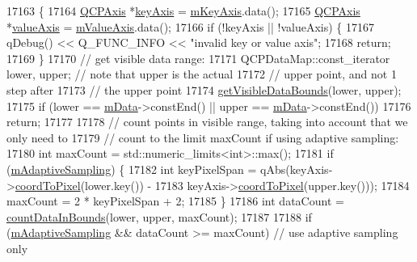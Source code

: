 \begin{DoxyCode}
17163                                                                     \{
17164   \hyperlink{class_q_c_p_axis}{QCPAxis} *\hyperlink{class_q_c_p_abstract_plottable_a72c7a09c22963f2c943f07112b311103}{keyAxis} = \hyperlink{class_q_c_p_abstract_plottable_a426f42e254d0f8ce5436a868c61a6827}{mKeyAxis}.data();
17165   \hyperlink{class_q_c_p_axis}{QCPAxis} *\hyperlink{class_q_c_p_abstract_plottable_a3106f9d34d330a6097a8ec5905e5b519}{valueAxis} = \hyperlink{class_q_c_p_abstract_plottable_a2901452ca4aea911a1827717934a4bda}{mValueAxis}.data();
17166   \textcolor{keywordflow}{if} (!keyAxis || !valueAxis) \{
17167     qDebug() << Q\_FUNC\_INFO << \textcolor{stringliteral}{"invalid key or value axis"};
17168     \textcolor{keywordflow}{return};
17169   \}
17170   \textcolor{comment}{// get visible data range:}
17171   QCPDataMap::const\_iterator lower, upper; \textcolor{comment}{// note that upper is the actual}
17172                                            \textcolor{comment}{// upper point, and not 1 step after}
17173                                            \textcolor{comment}{// the upper point}
17174   \hyperlink{class_q_c_p_graph_a6a317cb14a83dae0841c7041a63d6d9d}{getVisibleDataBounds}(lower, upper);
17175   \textcolor{keywordflow}{if} (lower == \hyperlink{class_q_c_p_graph_a8457c840f69a0ac49f61d30a509c5d08}{mData}->constEnd() || upper == \hyperlink{class_q_c_p_graph_a8457c840f69a0ac49f61d30a509c5d08}{mData}->constEnd())
17176     \textcolor{keywordflow}{return};
17177 
17178   \textcolor{comment}{// count points in visible range, taking into account that we only need to}
17179   \textcolor{comment}{// count to the limit maxCount if using adaptive sampling:}
17180   \textcolor{keywordtype}{int} maxCount = std::numeric\_limits<int>::max();
17181   \textcolor{keywordflow}{if} (\hyperlink{class_q_c_p_graph_aa951e78aeba714cf443be6da2e52502e}{mAdaptiveSampling}) \{
17182     \textcolor{keywordtype}{int} keyPixelSpan = qAbs(keyAxis->\hyperlink{class_q_c_p_axis_a985ae693b842fb0422b4390fe36d299a}{coordToPixel}(lower.key()) -
17183                             keyAxis->\hyperlink{class_q_c_p_axis_a985ae693b842fb0422b4390fe36d299a}{coordToPixel}(upper.key()));
17184     maxCount = 2 * keyPixelSpan + 2;
17185   \}
17186   \textcolor{keywordtype}{int} dataCount = \hyperlink{class_q_c_p_graph_a13f6a3aa60227e03ab1f7aa8eec6589f}{countDataInBounds}(lower, upper, maxCount);
17187 
17188   \textcolor{keywordflow}{if} (\hyperlink{class_q_c_p_graph_aa951e78aeba714cf443be6da2e52502e}{mAdaptiveSampling} && dataCount >= maxCount) \textcolor{comment}{// use adaptive sampling only}

\end{DoxyCode}
